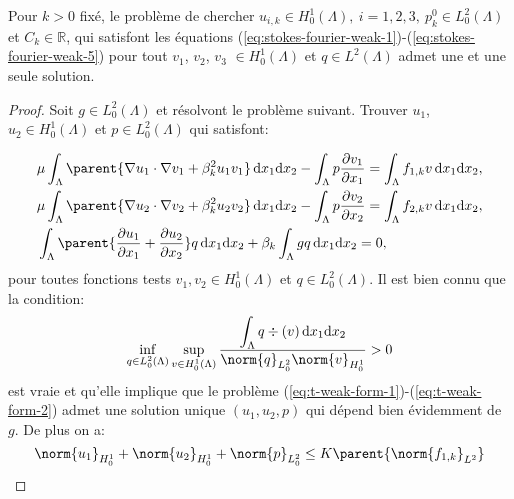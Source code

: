 \begin{proposition}\label{prop:existance-unicite-1}
  Pour $k > 0$ fixé, le problème de chercher $u_{i,k}\in H_0^1(\Lambda),\ i =
  1,2,3,\ p_k^0 \in L_0^2(\Lambda)$ et $C_k\in\mathbb R$, qui satisfont
  les équations
  (\ref{eq:stokes-fourier-weak-1})-(\ref{eq:stokes-fourier-weak-5})
  pour tout $v_1$, $v_2$, $v_3$ $\in H_0^1(\Lambda)$ et $q\in
  L^2(\Lambda)$ admet une et une seule solution.
\end{proposition}

\begin{proof}
  Soit $g\in L_0^2(\Lambda)$ et résolvont le problème
  suivant. Trouver $u_1$, $u_2\in H_0^1(\Lambda)$ et $p\in
  L_0^2(\Lambda)$ qui satisfont:

  \begin{align}
    &\mu\int_\Lambda \parent{\nabla u_1\cdot \nabla v_1 %
                            + \beta_k^2 u_1 v_1}\,\mathrm dx_1\mathrm dx_2 %
    - \int_\Lambda p\frac{\partial v_1}{\partial x_1} %
    = \int_\Lambda f_{1,k} v\, \mathrm dx_1\mathrm dx_2,\label{eq:t-weak-form-1}\\
    &\mu\int_\Lambda \parent{\nabla u_2\cdot \nabla v_2 %
                            + \beta_k^2 u_2 v_2}\,\mathrm dx_1\mathrm dx_2 %
    - \int_\Lambda p\frac{\partial v_2}{\partial x_2} %
    = \int_\Lambda f_{2,k} v\, \mathrm dx_1\mathrm dx_2,\label{eq:t-weak-form-2}\\
    &\int_\Lambda \parent{\frac{\partial u_1}{\partial x_1} %
                         + \frac{\partial u_2}{\partial x_2}} q \, \mathrm dx_1\mathrm dx_2 %
    + \beta_k \int_\Lambda g q\,\mathrm dx_1\mathrm dx_2 %
    = 0,\label{eq:t-weak-form-3}
  \end{align}
  pour toutes fonctions tests $v_1,v_2\in H_0^1(\Lambda)$ et $q\in
  L_0^2(\Lambda)$. Il est bien connu que la condition:
  \begin{equation}\label{eq:inf-sup}
    \inf_{q\in L_0^2(\Lambda)} %
    \sup_{v\in H_0^1(\Lambda)} %
    \frac{\displaystyle\int_\Lambda q\div(v)\,\mathrm dx_1\mathrm dx_2}%
         {\norm{q}_{L_0^2}\norm{v}_{H_0^1}}> 0
  \end{equation}
  est vraie et qu'elle implique que le problème
  (\ref{eq:t-weak-form-1})-(\ref{eq:t-weak-form-2}) admet une solution
  unique $(u_1, u_2, p)$ qui dépend bien évidemment de $g$. De
  plus on a:
  \begin{equation}\label{eq:t-estim-1}
    \norm{u_1}_{H_0^1} %
    + \norm{u_2}_{H_0^1} %
    + \norm{p}_{L_0^2} %
    \leq K\parent{\norm{f_{1,k}}_{L^2} %
}
\end{equation}
\end{proof}
